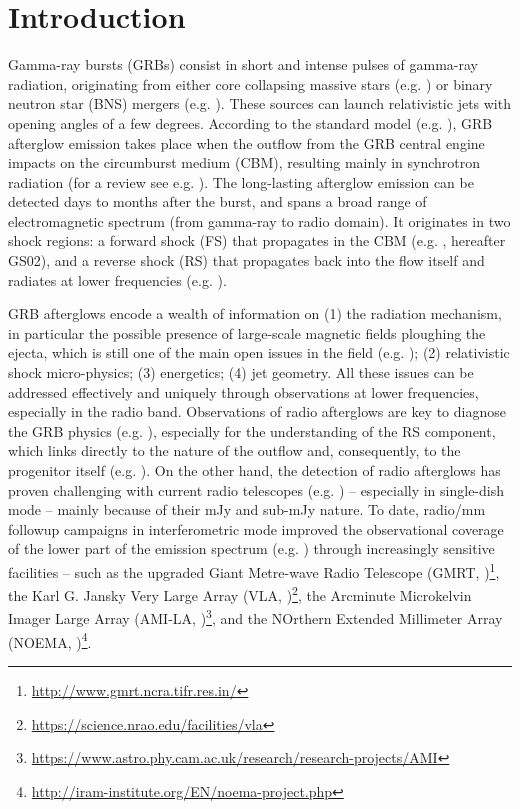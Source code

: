 \documentclass{aa}
\begin{document}
\section{Introduction}
\label{par:intro}

Gamma-ray bursts (GRBs) consist in short and intense pulses of gamma-ray radiation, originating from either core collapsing massive stars (e.g. \citealt{Woosley06}) or binary neutron star (BNS) mergers (e.g. \citealt{Abbott17}).
These sources can launch relativistic jets with opening angles of a few degrees.
According to the standard model (e.g. \citealp{Rees92,Meszaros97,Panaitescu98}), GRB afterglow emission takes place when the outflow from the GRB central engine impacts on the circumburst medium (CBM), resulting mainly in synchrotron radiation (for a review see e.g. \citealt{Piran04_rev,Meszaros06,Gao13}). The long-lasting afterglow emission can be detected days to months after the burst, and spans a broad range of electromagnetic spectrum (from gamma-ray to radio domain). It originates in two shock regions: a forward shock (FS) that propagates in the CBM (e.g. \citealt{GranotSari02}, hereafter GS02), and a reverse shock (RS) that propagates back into the flow itself and radiates at lower frequencies (e.g. \citealt{Meszaros99,Kobayashi00b,Kobayashi07a,Gao15}).

GRB afterglows encode a wealth of information on (1) the radiation mechanism, in particular the possible presence of large-scale magnetic fields ploughing the ejecta, which is still one of the main open issues in the field (e.g. \citealt{Jordana20}); (2) relativistic shock micro-physics; (3) energetics; (4) jet geometry.
All these issues can be addressed effectively and uniquely through observations at lower frequencies, especially in the radio band.
Observations of radio afterglows are key to diagnose the GRB physics (e.g. \citealt{Mundell07}), especially for the understanding of the RS component, which links directly to the nature of the outflow and, consequently, to the progenitor itself (e.g. \citealt{Kopac15}).
On the other hand, the detection of radio afterglows has proven challenging with current radio telescopes (e.g. \citealt{ChandraFrail12}) -- especially in single-dish mode \citep{Marongiu20b} -- mainly because of their mJy and sub-mJy nature.
To date, radio/mm followup campaigns in interferometric mode improved the observational coverage of the lower part of the emission spectrum (e.g. \citealt{Laskar13,Laskar15,Laskar18,Laskar19a}) through increasingly sensitive facilities -- such as the upgraded Giant Metre-wave Radio Telescope (GMRT, \citealt{Swarup90,Kapahi95,Gupta17})\footnote{\url{http://www.gmrt.ncra.tifr.res.in/}}, the Karl G. Jansky Very Large Array (VLA, \citealt{Thompson80})\footnote{\url{https://science.nrao.edu/facilities/vla}}, the Arcminute Microkelvin Imager Large Array (AMI-LA, \citealt{Zwart08})\footnote{\url{https://www.astro.phy.cam.ac.uk/research/research-projects/AMI}}, and the NOrthern Extended Millimeter Array (NOEMA, \citealt{Chenu16})\footnote{\url{http://iram-institute.org/EN/noema-project.php}}.
\end{document}
